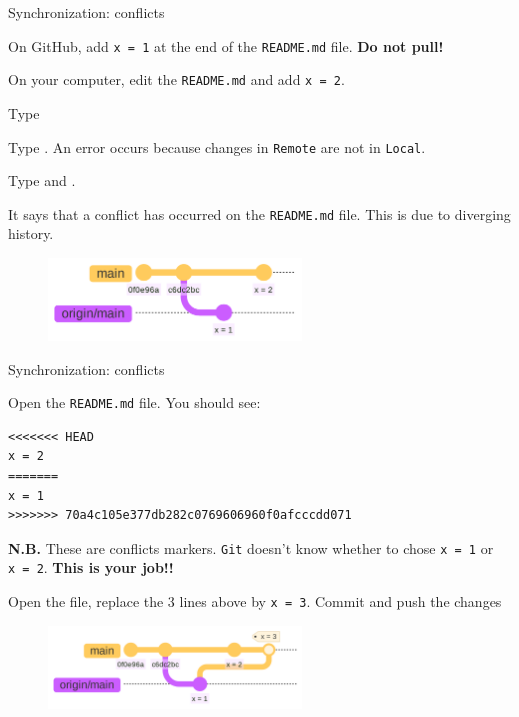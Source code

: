 \documentclass[10pt]{beamer}
\begin{document}
\begin{frame}{Synchronization: conflicts}
\protect\hypertarget{synchronization-conflicts}{}

On GitHub, add \texttt{x\ =\ 1} at the end of the \texttt{README.md}
file. \textbf{Do not pull!}

On your computer, edit the \texttt{README.md} and add
\texttt{x\ =\ 2}.

Type 

Type . An error occurs because changes in
\texttt{Remote} are not in \texttt{Local}.

Type  and .

It says that a conflict has occurred on the \texttt{README.md} file.
This is due to diverging history.

\begin{figure}[H]

{\centering \includegraphics[width=0.6\textwidth]{mermaid/mermaid-figure-12.png}

}

\end{figure}
\end{frame}

\begin{frame}[fragile]{Synchronization: conflicts}
\protect\hypertarget{synchronization-conflicts-1}{}

Open the \texttt{README.md} file. You should see:

\begin{verbatim}
<<<<<<< HEAD
x = 2
=======
x = 1
>>>>>>> 70a4c105e377db282c0769606960f0afcccdd071
\end{verbatim}
\textbf{N.B.} These are conflicts markers. \texttt{Git} doesn't know whether to chose
\texttt{x\ =\ 1} or \texttt{x\ =\ 2}. \textbf{This is your job!!}

Open the file, replace the 3 lines above by \texttt{x\ =\ 3}. Commit and push
the changes

\begin{figure}[H]

{\centering \includegraphics[width=0.6\textwidth]{mermaid/mermaid-figure-11.png}

}

\end{figure}
\end{frame}
\end{document}

